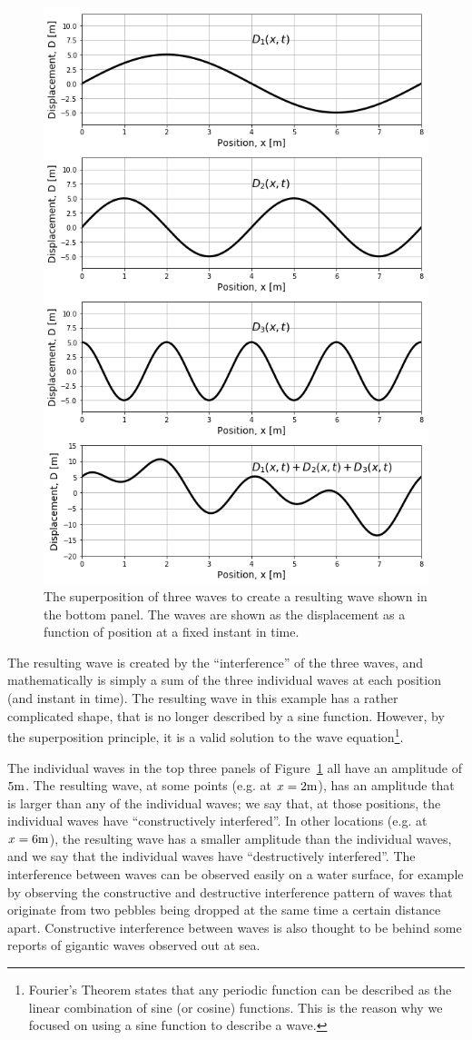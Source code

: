 \begin{figure}[!htbp]
\centering
\includegraphics[width=0.7\linewidth]{files/superposition-77299987696f501413b72354db171fd4.png}
\caption[]{The superposition of three waves to create a resulting wave shown in the bottom panel. The waves are shown as the displacement as a function of position at a fixed instant in time.}
\label{fig:waves:superposition}
\end{figure}

The resulting wave is created by the ``interference'' of the three waves, and mathematically is simply a sum of the three individual waves at each position (and instant in time). The resulting wave in this example has a rather complicated shape, that is no longer described by a sine function. However, by the superposition principle, it is a valid solution to the wave equation\footnote{Fourier's Theorem states that any periodic function can be described as the linear combination of sine (or cosine) functions. This is the reason why we focused on using a sine function to describe a wave.}.

The individual waves in the top three panels of Figure~\ref{fig:waves:superposition} all have an amplitude of $5 {\rm m}$. The resulting wave, at some points (e.g. at $x=2 {\rm m}$), has an amplitude that is larger than any of the individual waves; we say that, at those positions, the individual waves have ``constructively interfered''. In other locations (e.g. at $x=6 {\rm m}$), the resulting wave has a smaller amplitude than the individual waves, and we say that the individual waves have ``destructively interfered''. The interference between waves can be observed easily on a water surface, for example by observing the constructive and destructive interference pattern of waves that originate from two pebbles being dropped at the same time a certain distance apart. Constructive interference between waves is also thought to be behind some reports of gigantic waves observed out at sea.

